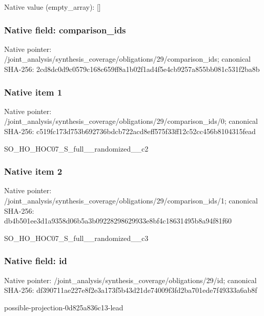 \documentclass[10pt,a4paper]{article}
\begin{document}
Native value (empty\_\allowbreak{}array): []

\subsubsection{Native field: comparison\_\allowbreak{}ids}
Native pointer: /joint\_\allowbreak{}analysis/synthesis\_\allowbreak{}coverage/obligations/29/comparison\_\allowbreak{}ids; canonical SHA-256: 2cd8dc0d9c0579c168c659ff8a1b02f1ad4f5e4cb9257a855bb081c531f2ba8b

\subsubsection{Native item 1}
Native pointer: /joint\_\allowbreak{}analysis/synthesis\_\allowbreak{}coverage/obligations/29/comparison\_\allowbreak{}ids/0; canonical SHA-256: c519fc173d753b692736bdcb722acd8eff575f33ff12c52cc456b8104315fead

\begingroup\raggedright\sloppy SO\_\allowbreak{}HO\_\allowbreak{}HOC07\_\allowbreak{}S\_\allowbreak{}full\_\allowbreak{}\_\allowbreak{}randomized\_\allowbreak{}\_\allowbreak{}c2\par\endgroup

\subsubsection{Native item 2}
Native pointer: /joint\_\allowbreak{}analysis/synthesis\_\allowbreak{}coverage/obligations/29/comparison\_\allowbreak{}ids/1; canonical SHA-256: db4b501ee3d1a9358d06b5a3b09228298629933e8bf4c18631495b8a94f81f60

\begingroup\raggedright\sloppy SO\_\allowbreak{}HO\_\allowbreak{}HOC07\_\allowbreak{}S\_\allowbreak{}full\_\allowbreak{}\_\allowbreak{}randomized\_\allowbreak{}\_\allowbreak{}c3\par\endgroup

\subsubsection{Native field: id}
Native pointer: /joint\_\allowbreak{}analysis/synthesis\_\allowbreak{}coverage/obligations/29/id; canonical SHA-256: df390711ae227e8f2e3a173f5b43d21de74009f3fd2ba701ede7f49333a6ab8f

\begingroup\raggedright\sloppy possible-projection-0d825a836c13-lead\par\endgroup
\end{document}
